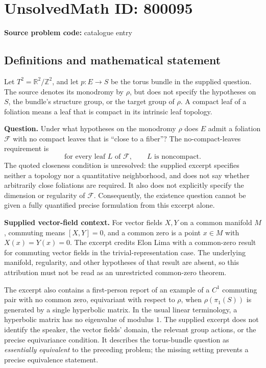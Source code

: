\documentclass[11pt]{article}
\newcommand{\Z}{\mathbb{Z}}
\newcommand{\R}{\mathbb{R}}
\begin{document}
\section*{UnsolvedMath ID: 800095}
\textbf{Source problem code:} catalogue entry
\subsection{Definitions and mathematical statement}
Let \(T^2=\R^2/\Z^2\), and let \(p:E\to S\) be the torus bundle in the supplied question. The source denotes its monodromy by \(\rho\), but does not specify the hypotheses on \(S\), the bundle's structure group, or the target group of \(\rho\). A compact leaf of a foliation means a leaf that is compact in its intrinsic leaf topology.

\textbf{Question.} Under what hypotheses on the monodromy \(\rho\) does \(E\) admit a foliation \(\mathcal F\) with no compact leaves that is ``close to a fiber''? The no-compact-leaves requirement is
\[
\text{for every leaf }L\text{ of }\mathcal F,\qquad L\text{ is noncompact}.
\]
The quoted closeness condition is unresolved: the supplied excerpt specifies neither a topology nor a quantitative neighborhood, and does not say whether arbitrarily close foliations are required. It also does not explicitly specify the dimension or regularity of \(\mathcal F\). Consequently, the existence question cannot be given a fully quantified precise formulation from this excerpt alone.

\textbf{Supplied vector-field context.} For vector fields \(X,Y\) on a common manifold \(M\), commuting means \([X,Y]=0\), and a common zero is a point \(x\in M\) with \(X(x)=Y(x)=0\). The excerpt credits Elon Lima with a common-zero result for commuting vector fields in the trivial-representation case. The underlying manifold, regularity, and other hypotheses of that result are absent, so this attribution must not be read as an unrestricted common-zero theorem.

The excerpt also contains a first-person report of an example of a \(C^1\) commuting pair with no common zero, equivariant with respect to \(\rho\), when \(\rho(\pi_1(S))\) is generated by a single hyperbolic matrix. In the usual linear terminology, a hyperbolic matrix has no eigenvalue of modulus \(1\). The supplied excerpt does not identify the speaker, the vector fields' domain, the relevant group actions, or the precise equivariance condition. It describes the torus-bundle question as \emph{essentially equivalent} to the preceding problem; the missing setting prevents a precise equivalence statement.
\end{document}
